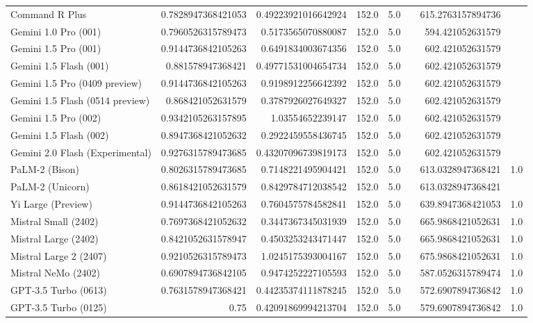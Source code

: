 \begin{table}[htp]
{\begin{tabular}{lrrrrrrr}
Command R Plus & 0.7828947368421053 & 0.49223921016642924 & 152.0 & 5.0 &  & 615.2763157894736 &  \\
Gemini 1.0 Pro (001) & 0.7960526315789473 & 0.5173565070880087 & 152.0 & 5.0 &  & 594.421052631579 &  \\
Gemini 1.5 Pro (001) & 0.9144736842105263 & 0.6491834003674356 & 152.0 & 5.0 &  & 602.421052631579 &  \\
Gemini 1.5 Flash (001) & 0.881578947368421 & 0.49771531004654734 & 152.0 & 5.0 &  & 602.421052631579 &  \\
Gemini 1.5 Pro (0409 preview) & 0.9144736842105263 & 0.9198912256642392 & 152.0 & 5.0 &  & 602.421052631579 &  \\
Gemini 1.5 Flash (0514 preview) & 0.868421052631579 & 0.3787926027649327 & 152.0 & 5.0 &  & 602.421052631579 &  \\
Gemini 1.5 Pro (002) & 0.9342105263157895 & 1.03554652239147 & 152.0 & 5.0 &  & 602.421052631579 &  \\
Gemini 1.5 Flash (002) & 0.8947368421052632 & 0.2922459558436745 & 152.0 & 5.0 &  & 602.421052631579 &  \\
Gemini 2.0 Flash (Experimental) & 0.9276315789473685 & 0.43207096739819173 & 152.0 & 5.0 &  & 602.421052631579 &  \\
PaLM-2 (Bison) & 0.8026315789473685 & 0.7148221495904421 & 152.0 & 5.0 &  & 613.0328947368421 & 1.0 \\
PaLM-2 (Unicorn) & 0.8618421052631579 & 0.8429784712038542 & 152.0 & 5.0 &  & 613.0328947368421 &  \\
Yi Large (Preview) & 0.9144736842105263 & 0.7604575784582841 & 152.0 & 5.0 &  & 639.8947368421053 & 1.0 \\
Mistral Small (2402) & 0.7697368421052632 & 0.3447367345031939 & 152.0 & 5.0 &  & 665.9868421052631 & 1.0 \\
Mistral Large (2402) & 0.8421052631578947 & 0.4503253243471447 & 152.0 & 5.0 &  & 665.9868421052631 & 1.0 \\
Mistral Large 2 (2407) & 0.9210526315789473 & 1.0245175393004167 & 152.0 & 5.0 &  & 675.9868421052631 & 1.0 \\
Mistral NeMo (2402) & 0.6907894736842105 & 0.9474252227105593 & 152.0 & 5.0 &  & 587.0526315789474 & 1.0 \\
GPT-3.5 Turbo (0613) & 0.7631578947368421 & 0.44235374111878245 & 152.0 & 5.0 &  & 572.6907894736842 & 1.0 \\
GPT-3.5 Turbo (0125) & 0.75 & 0.42091869994213704 & 152.0 & 5.0 &  & 579.6907894736842 & 1.0 \\

\end{tabular}}
\end{table}
